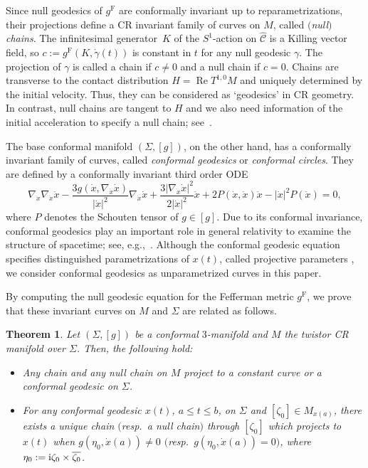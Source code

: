 \documentclass[pdftex]{sigma}
\newcommand\ol{\overline}
\newcommand{\wh}{\widehat}
\numberwithin{equation}{section}
\newtheorem{Theorem}{Theorem}[section]
\begin{document}
Since null geodesics of $g^{\mathrm{F}}$ are conformally invariant up to reparametrizations, their projections define a CR invariant family of curves on $M$, called {\it $($null$)$ chains}. The infinitesimal generator~$K$ of the $S^1$-action on $\wh{\mathcal{C}}$ is a Killing vector field,
so $c:=g^{\mathrm{F}}(K, \dot \gamma(t))$ is constant in $t$ for any null geodesic $\gamma$. The projection of $\gamma$ is called a chain if $c\neq0$ and a null chain if $c=0$. Chains are transverse to the contact distribution $H=\operatorname{Re} T^{1, 0}M$ and uniquely determined by the initial velocity. Thus, they can be considered as `geodesics' in CR geometry. In contrast, null chains are tangent to $H$ and we also need information of the initial acceleration to specify a null chain; see~\cite{Koch}.

The base conformal manifold $(\Sigma, [g])$, on the other hand, has a conformally invariant family of curves, called {\it conformal geodesics} or {\it conformal circles}. They are defined by a conformally invariant
third order ODE
\[
\nabla_{\dot x}\nabla_{\dot x}\dot x-\frac{3g(\dot x, \nabla_{\dot x}\dot x)}{|\dot x|^2}\nabla_{\dot x}\dot x+\frac{3|\nabla_{\dot x}\dot x|^2}{2|\dot x|^2}\dot x
+2P(\dot x, \dot x)\dot x-|\dot x|^2P(\dot x)=0,
\]
where $P$ denotes the Schouten tensor of $g\in[g]$.
Due to its conformal invariance, conformal geodesics play an important role in general relativity to examine the structure of spacetime; see, e.g.,~\cite{DT, FS}.
Although the conformal geodesic equation specifies distinguished parametrizations of $x(t)$, called projective parameters \cite{BE}, we consider conformal geodesics as unparametrized curves in this paper.

By computing the null geodesic equation for the Fefferman metric $g^{\mathrm{F}}$, we prove that these invariant curves on $M$ and $\Sigma$ are related as follows.

\begin{Theorem}\label{chain-projection}
Let $(\Sigma, [g])$ be a conformal $3$-manifold and $M$ the twistor CR manifold over $\Sigma$. Then, the following hold:
\begin{itemize}\itemsep=0pt
\item[$(1)$] Any chain and any null chain on $M$ project to a constant curve or a conformal geodesic on $\Sigma$.
\item[$(2)$] For any conformal geodesic $x(t)$, $a\le t\le b$, on $\Sigma$ and $[\zeta_0]\in M_{x(a)}$, there exists a unique chain $($resp.\ a null chain$)$ through $[\zeta_0]$ which projects to $x(t)$ when $g(\eta_0, \dot x(a))\neq0$ $($resp.\ $g(\eta_0, \dot x(a))=0)$, where $\eta_0:= {\rm i}\zeta_0\times \ol{\zeta_0}$.
\end{itemize}
\end{Theorem}
\end{document}
